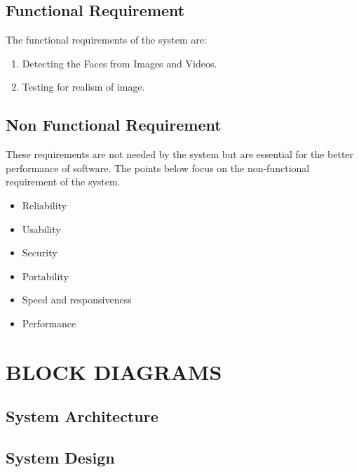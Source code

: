 \documentclass[12 pt]{article}
\begin{document}
\subsection{Functional Requirement}
The functional requirements of the system are:
\begin{enumerate}
    \item Detecting the Faces from Images and Videos.
    \item Testing for realism of image.
\end{enumerate}

\subsection{Non Functional Requirement}
\justify
These requirements are not needed by the system but are essential for the better
performance of software. The points below focus on the non-functional requirement of
the system.
\begin{itemize}
    \item Reliability
    \item   Usability
    \item   Security
    \item   Portability
    \item   Speed and responsiveness
    \item  Performance
\end{itemize}


\newpage

\section{BLOCK DIAGRAMS}
\subsection{System Architecture}
\newpage
\subsection{System Design}
\newpage
\end{document}
